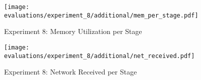 \begin{figure}[p]
    \begin{adjustwidth}{-0.2\paperwidth}{-0.2\paperwidth}
        \centering
        \texttt{[image: evaluations/experiment\_8/additional/mem\_per\_stage.pdf]}
        \caption{Experiment 8: Memory Utilization per Stage}
        \label{fig:eval_8_memory_per_stage}
    \end{adjustwidth}
\end{figure}

\begin{figure}[t]
    \begin{adjustwidth}{-0.2\paperwidth}{-0.2\paperwidth}
        \centering
        \texttt{[image: evaluations/experiment\_8/additional/net\_received.pdf]}
        \caption{Experiment 8: Network Received per Stage}
        \label{fig:eval_8_memory_per_stage}
    \end{adjustwidth}
\end{figure}